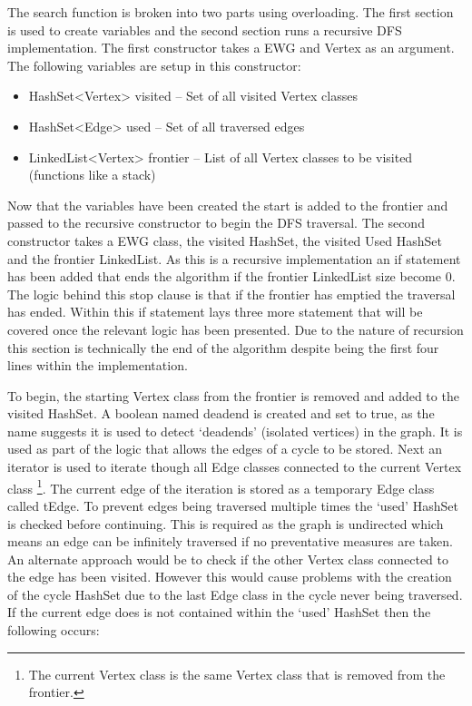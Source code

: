 \documentclass{AISB2008}
\begin{document}
{The search function is broken into two parts using overloading. The first section is used to create variables and the second section runs a recursive DFS implementation. The first constructor takes a EWG and Vertex as an argument. 
The following variables are setup in this constructor:

\begin{itemize}
\item HashSet<Vertex> visited – Set of all visited Vertex classes
\item HashSet<Edge> used – Set of all traversed edges
\item LinkedList<Vertex> frontier – List of all Vertex classes to be visited (functions like a stack)
\end{itemize}

Now that the variables have been created the start is added to the frontier and passed to the recursive constructor to begin the DFS traversal. The second constructor takes a EWG class, the visited HashSet, the visited Used HashSet and the frontier LinkedList. As this is a recursive implementation an if statement has been added that ends the algorithm if the frontier LinkedList size become 0. The logic behind this stop clause is that if the frontier has emptied the traversal has ended. Within this if statement lays three more statement that will be covered once the relevant logic has been presented. Due to the nature of recursion this section is technically the end of the algorithm despite being the first four lines within the implementation.

To begin, the starting Vertex class from the frontier is removed and added to the visited HashSet. A boolean named deadend is created and set to true, as the name suggests it is used to detect ‘deadends’ (isolated vertices) in the graph. It is used as part of the logic that allows the edges of a cycle to be stored.  Next an iterator is used to iterate though all Edge classes connected to the current Vertex class  \footnote{The current Vertex class is the same Vertex class that is removed from the frontier.}. The current edge of the iteration is stored as a temporary Edge class called tEdge. To prevent edges being traversed multiple times the ‘used’ HashSet is checked before continuing. This is required as the graph is undirected which means an edge can be infinitely traversed if no preventative measures are taken. An alternate approach would be to check if the other Vertex class connected to the edge has been visited. However this would cause problems with the creation of the cycle HashSet due to the last Edge class in the cycle never being traversed.
If the current edge does is not contained within the ‘used’ HashSet then the following occurs:

}
\end{document}
